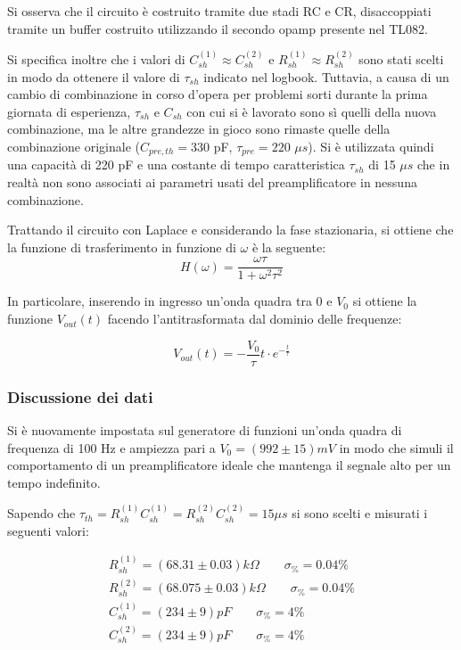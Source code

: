 \documentclass{article}
\begin{document}
Si osserva che il circuito è costruito tramite due stadi RC e CR, disaccoppiati tramite un buffer costruito utilizzando il secondo 
opamp presente nel TL082.

Si specifica inoltre che i valori di $C_{sh}^{(1)}\approx C_{sh}^{(2)}$ e $R_{sh}^{(1)}\approx R_{sh}^{(2)}$ sono stati scelti in modo da ottenere 
il valore di $\tau_{sh}$ indicato nel logbook. Tuttavia, a causa di un cambio di combinazione in corso d'opera per problemi sorti durante la 
prima giornata di esperienza, $\tau_{sh}$ e $C_{sh}$ con cui si è lavorato sono sì quelli della nuova combinazione, ma le altre grandezze in gioco sono rimaste quelle
della combinazione originale ($C_{pre,th}=330$ pF, $\tau_{pre}=220$ $\mu s$). Si è utilizzata quindi una capacità di 220 pF
e una costante di tempo caratteristica $\tau_{sh}$ di 15 $\mu s$ che in realtà non sono associati ai parametri usati del preamplificatore in nessuna combinazione.

Trattando il circuito con Laplace e considerando la fase stazionaria, si ottiene che la funzione di trasferimento in funzione di 
$\omega$ è la seguente:
\begin{equation}
H(\omega)=\frac{\omega \tau}{1+\omega^2\tau^2}
\end{equation}

In particolare, inserendo in ingresso un'onda quadra tra 0 e $V_0$ si ottiene la funzione $V_{out}(t)$ facendo l'antitrasformata 
dal dominio delle frequenze:

\begin{equation}
    \label{eqn:V_sh}
    V_{out}(t)= - \frac{V_0}{\tau} t \cdot e^{-\frac{t}{\tau}}
\end{equation}
    

\subsubsection{Discussione dei dati}
Si è nuovamente impostata sul generatore di funzioni un'onda quadra di frequenza di 100 Hz e ampiezza pari a $V_{0}=(992 \pm 15)mV$
in modo che simuli il comportamento di un preamplificatore ideale che mantenga il segnale alto per un tempo indefinito.

Sapendo che $\tau_{th}=R_{sh}^{(1)} C_{sh}^{(1)} = R_{sh}^{(2)} C_{sh}^{(2)}=15 \mu s$ si sono scelti e misurati i seguenti valori:

\begin{align*}
R_{sh}^{(1)} = (68.31  \pm 0.03)k\Omega \quad\quad \sigma_{\%}=  0.04 \% \\
R_{sh}^{(2)} = (68.075  \pm 0.03)k\Omega \quad\quad \sigma_{\%}=  0.04\% \\
C_{sh}^{(1)}= (234 \pm  9)pF \quad\quad \sigma_{\%}= 4 \% \\
C_{sh}^{(2)}= (234 \pm  9)pF \quad\quad \sigma_{\%}= 4 \% \\
\end{align*}
\end{document}
